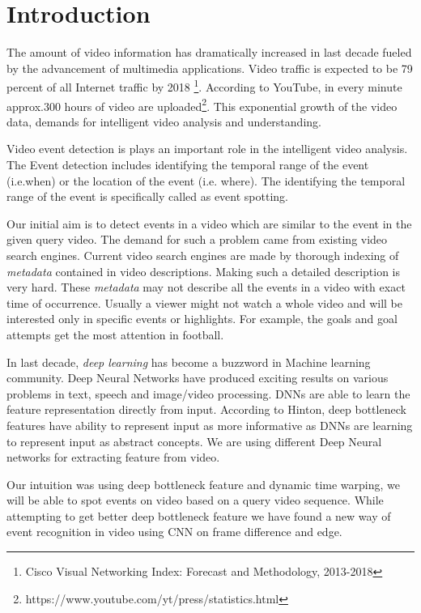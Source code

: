 \chapter{Introduction}
\label{chap:intro}

The amount of video information has dramatically increased in last decade fueled by the advancement of multimedia applications. Video traffic is expected to be  79 percent of all Internet traffic by 2018 \footnote{Cisco Visual Networking Index: Forecast and Methodology, 2013-2018}. According to YouTube, in every minute approx.300 hours of video are uploaded\footnote{https://www.youtube.com/yt/press/statistics.html}. This exponential growth of the video data, demands for intelligent video analysis and understanding.

Video event detection is plays an important role in the intelligent video analysis. The Event detection includes identifying the temporal range of the event (i.e.when) or the location of the event (i.e. where). The identifying the temporal range of the event is specifically called as event spotting. 

Our initial aim is to detect events in a video which are similar to the event in the given query video. The demand for such a problem came from existing video search engines. Current video search engines are made by thorough indexing of \textit{metadata} contained in video descriptions. Making such a detailed description is very hard. These \textit{metadata} may not describe all the events in a video with exact time of occurrence. Usually a viewer might not watch a whole video and will be interested only in specific events or highlights. For example, the goals and goal attempts get the most attention in football.

In last decade, \textit{deep learning} has become a  buzzword in Machine learning community. Deep Neural Networks have produced exciting results on various problems in text, speech and image/video processing. DNNs are able to learn the feature representation directly from input. According to Hinton, deep bottleneck features have ability to represent input as more informative as DNNs are learning to represent input as abstract concepts. We are using different Deep Neural networks for extracting feature from video.

Our intuition was using deep bottleneck feature and dynamic time warping, we will be able to spot events on video based on a query video sequence. While attempting  to get better deep bottleneck feature we have found a new  way of event recognition in video using CNN on frame difference and edge.

